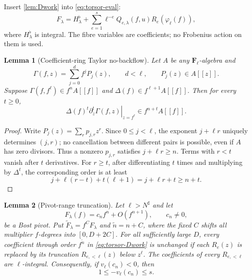 \documentclass[11pt]{article}
\newtheorem{lemma}[lemma]{Lemma}
\theoremstyle{definition}
\theoremstyle{remark}
\newcommand{\F}{\mathbf F}
\begin{document}
Insert \cref{lem:Dwork} into \eqref{eq:torsor-eval}:
\begin{equation}\label{eq:torsor-Dwork}
 F_\lambda=H_\lambda^\flat+
 \sum_{e=1}^s\ell^{-e}Q_{e,\lambda}(f,u)
 R_e(\varphi_\ell(f)),
\end{equation}
where $H_\lambda^\flat$ is integral.  The fibre variables are coefficients;
no Frobenius action on them is used.

\begin{lemma}[Coefficient-ring Taylor no-backflow]\label{lem:no-backflow}
Let $A$ be any $\F_\ell$-algebra and
\[
 \Gamma(f,z)=\sum_{j=0}^df^jP_j(z),
 \qquad d<\ell,
 \qquad P_j(z)\in A[[z]].
\]
Suppose $\Gamma(f,f^\ell)\in f^nA[[f]]$ and
$\Delta(f)\in f^{\ell+1}A[[f]]$.  Then for every $t\ge0$,
\begin{equation}\label{eq:no-backflow}
 \Delta(f)^t
 \left.\partial_z^t\Gamma(f,z)\right|_{z=f^\ell}
 \in f^{n+t}A[[f]].
\end{equation}
\end{lemma}

\begin{proof}
Write $P_j(z)=\sum_rp_{j,r}z^r$.  Since $0\le j<\ell$, the exponent
$j+\ell r$ uniquely determines $(j,r)$; no cancellation between different
pairs is possible, even if $A$ has zero divisors.  Thus a nonzero
$p_{j,r}$ satisfies $j+\ell r\ge n$.  Terms with $r<t$ vanish after $t$
derivatives.  For $r\ge t$, after differentiating $t$ times and multiplying
by $\Delta^t$, the corresponding order is at least
\[
 j+\ell(r-t)+t(\ell+1)=j+\ell r+t\ge n+t.
\]
\end{proof}

\begin{lemma}[Pivot-range truncation]\label{lem:pivot-truncation}
Let $\ell>N^\sharp$ and let
\[
 F_\lambda(f)=c_nf^n+O(f^{n+1}),
 \qquad c_n\ne0,
\]
be a Bost pivot.  Put
$\widetilde F_\lambda=f^CF_\lambda$ and $\widetilde n=n+C$, where the fixed
$C$ shifts all multiplier $f$-degrees into $[0,D+2C]$.  For all sufficiently
large $D$, every coefficient through order $f^{\widetilde n}$ in
\eqref{eq:torsor-Dwork} is unchanged if each $R_e(z)$ is replaced by its
truncation $R_{e,<\ell}(z)$ below $z^\ell$.  The coefficients of every
$R_{e,<\ell}$ are $\ell$-integral.  Consequently, if
$v_\ell(c_n)<0$, then
\begin{equation}\label{eq:pivot-pole-bound}
 1\le -v_\ell(c_n)\le s.
\end{equation}
\end{lemma}
\end{document}
